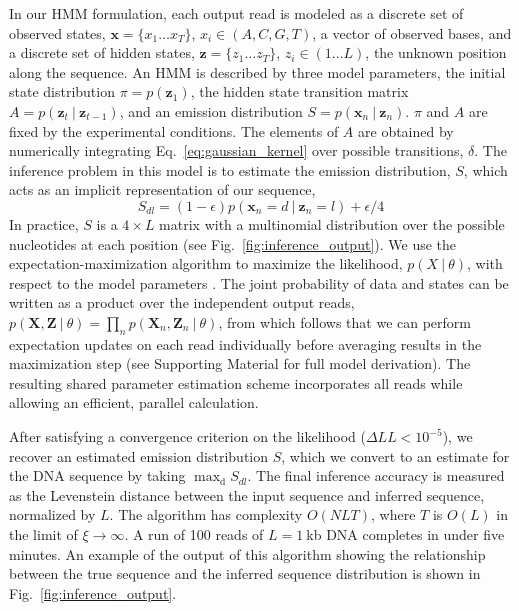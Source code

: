 \documentclass{biophys_letter}
\newcommand{\err}{\epsilon}
\newcommand{\kje}[1]{\textcolor{BurntOrange}{#1}}
\begin{document}
In our HMM formulation, each output read is modeled as a discrete set of observed states, $\mathbf{x}=\{x_{1}\dots x_{T}\}$, $x_i \in (A,C,G,T)$, a vector of observed bases, and a discrete set of hidden states, $\mathbf{z}=\{z_{1} \dots z_{T}\}$, $z_i \in (1 \dots L)$, the unknown position along the sequence.
An HMM is described by three model parameters, the initial state distribution $\pi=p(\mathbf{z}_{1})$, the hidden state transition matrix $A=p(\mathbf{z}_{t}\:|\:\mathbf{z}_{t-1})$, and an emission distribution $S=p(\mathbf{x}_{n}\:|\:\mathbf{z}_{n})$.
$\pi$ and $A$ are fixed by the experimental conditions.
\kje{The elements of $A$ are obtained by numerically integrating Eq.~\ref{eq:gaussian_kernel} over possible transitions, $\delta$.}
The inference problem in this model is to estimate the emission distribution, $S$, which acts as an implicit representation of our sequence,
\begin{equation}
  S_{dl} = (1-\err)p(\mathbf{x}_n = d\:|\:\mathbf{z}_{n} = l) + \err/4
\end{equation}
In practice, $S$ is a $4 \times L$ matrix with a multinomial distribution over the possible nucleotides at each position (see Fig.~\ref{fig:inference_output}).
We use the expectation-maximization algorithm to maximize the likelihood, $p(X \:|\: \theta)$, with respect to the model parameters \cite{Baum:1970}.
The joint probability of data and states can be written as a product over the independent output reads, $p(\mathbf{X},\mathbf{Z}\:|\:\theta)=\prod_{n}p(\mathbf{X}_n,\mathbf{Z}_n\:|\:\theta)$, from which follows that we can perform expectation updates on each read individually before averaging results in the maximization step (see Supporting Material for full model derivation).
The resulting shared parameter estimation scheme incorporates all reads while allowing an efficient, parallel calculation.

After satisfying a convergence criterion on the likelihood (${\Delta}LL<10^{-5}$), we recover an estimated emission distribution $S$, which we convert to an estimate for the DNA sequence by taking $\mathrm{\max_{d}} {S_{dl}}$.
The final inference accuracy is measured as the Levenstein distance between the input sequence and inferred sequence, normalized by $L$.
The algorithm has complexity $O(NLT)$, where $T$ is $O(L)$ in the limit of $\xi\rightarrow\infty$.
A run of 100 reads of $L=1\:$kb DNA completes in under five minutes.
An example of the output of this algorithm showing the relationship between the true sequence and the inferred sequence distribution is shown in Fig.~\ref{fig:inference_output}.
\end{document}
